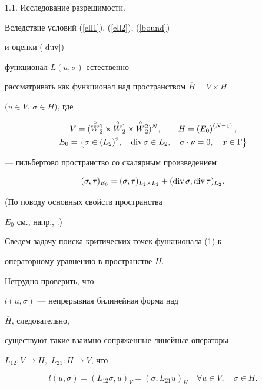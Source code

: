 1.1. Исследование разрешимости. 


Вследствие условий (\ref{ell1}), (\ref{ell2}), (\ref{bound})


 и оценки (\ref{duv})


функционал $L(u, \sigma)$ естественно 


рассматривать как функционал над пространством $ \overline H = V \times H$ 


$(u \in V$, $\sigma \in H)$, где


\begin{gather*}


V = ( \overset\circ W{}^1_2 \times \overset\circ W{}^1_2 \times


\overset\circ W{}^2_2 )^N, 


\qquad H = \left ( E_0 \right )^{(N-1)},\\


E_0 = \left \{ \sigma \in ( L_2 )^2,\quad


 \divv \sigma \in L_2,\quad \sigma \cdot \nu = 0,\quad x \in \Gamma 


\right \}


\end{gather*}


--- гильбертово пространство со скалярным произведением


$$


(\sigma,\tau )_{E_{0}} = (\sigma, \tau )_{L_{2} \times L_{2}} + 


(\divv \sigma, \divv \tau )_{L_{2}}.


$$


(По поводу основных свойств пространства 


$E_{0}$ см., напр., \cite{Tem}.)





Сведем задачу поиска критических точек функционала (1) к


операторному уравнению в пространстве $\overline H$.


Нетрудно проверить, что


 $l(u,\sigma)$ --- непрерывная билинейная форма над


$\overline {H} $, следовательно,


существуют такие взаимно сопряженные линейные операторы 


$L_{12}:V \to H,$ $ L_{21}:H \to V $, что


\begin{equation}


\label{L12}


l(u,\sigma) = (L_{12}\sigma, u)_{V} = (\sigma ,L_{21}u)_{H} \quad \forall


u \in V, \quad \sigma \in H.


\end{equation}





